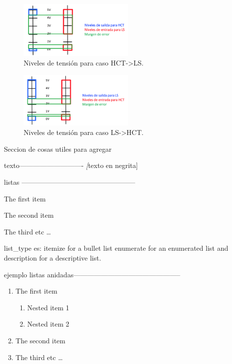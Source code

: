 \begin{figure}[h]%
   \centering
    \includegraphics[width=0.5\textwidth]{HCT->LS}
    \caption{Niveles de tensi\'on para caso HCT->LS.} %
\end{figure}

\begin{figure}[h]%
   \centering
    \includegraphics[width=0.5\textwidth]{LS->HCT}
    \caption{Niveles de tensi\'on para caso LS->HCT.} %
\end{figure}


\iffalse
Seccion de cosas utiles para agregar

texto----------------------------
\textit[texto en negrita]




listas --------------------------------------------------
\begin{list_type}  
\item The first item 
\item The second item 
\item The third etc \ldots 
\end{list_type}

list_type es:
itemize for a bullet list
enumerate for an enumerated list and
description for a descriptive list.

ejemplo listas anidadas-----------------------------------------------

\begin{enumerate}
\item The first item
\begin{enumerate}
\item Nested item 1
\item Nested item 2
\end{enumerate}
\item The second item
\item The third etc \ldots
\end{enumerate}

